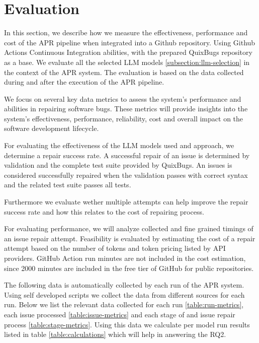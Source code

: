\section{Evaluation} \label{section:evaluation}
In this section, we describe how we measure the effectiveness, performance and cost of the APR pipeline when integrated into a Github repository. Using Github Actions Continuous Integration abilities, with the prepared QuixBugs repository as a base. We evaluate all the selected LLM models \ref{subsection:llm-selection} in the context of the APR system. The evaluation is based on the data collected during and after the execution of the APR pipeline.

We focus on several key data metrics to assess the system's performance and abilities in repairing software bugs. These metrics will provide insights into the system's effectiveness, performance, reliability, cost and overall impact on the software development lifecycle.

For evaluating the effectiveness of the LLM models used and approach, we determine a repair success rate. A successful repair of an issue is determined by validation and the complete test suite provided by QuixBugs. An issues is considered successfully repaired when the validation passes with correct syntax and the related test suite passes all tests.

Furthermore we evaluate wether multiple attempts can help improve the repair success rate and how this relates to the cost of repairing process.

For evaluating performance, we will analyze collected and fine grained timings of an issue repair attempt. Feasibility is evaluated by estimating the cost of a repair attempt based on the number of tokens and token pricing listed by API providers. GitHub Action run minutes are not included in the cost estimation, since 2000 minutes are included in the free tier of GitHub for public repositories.

The following data is automatically collected by each run of the APR system. Using self developed scripts we collect the data from different sources for each run. Below we list the relevant data collected for each run \ref{table:run-metrics}, each issue processed \ref{table:issue-metrics} and each stage of and issue repair process \ref{table:stage-metrics}. Using this data we calculate per model run results listed in table \ref{table:calculations} which will help in answering the RQ2.

